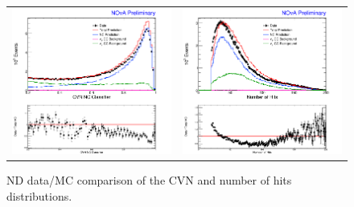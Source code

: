 \begin{figure}[p]
  \centering
  \begin{tabular}{c c}
    \includegraphics[width=.47\textwidth]{figures/NDDataMC/CVNNusNDRat.png} &
    \includegraphics[width=.47\textwidth]{figures/NDDataMC/NHitNusNDRat.png} \\
  \end{tabular}
  \caption[ND Data/MC Comparison: NC Selection Variable Distributions]{ND data/MC comparison of the CVN and number of hits distributions.}
  \label{fig:NDDataMCNCSel}
\end{figure}

